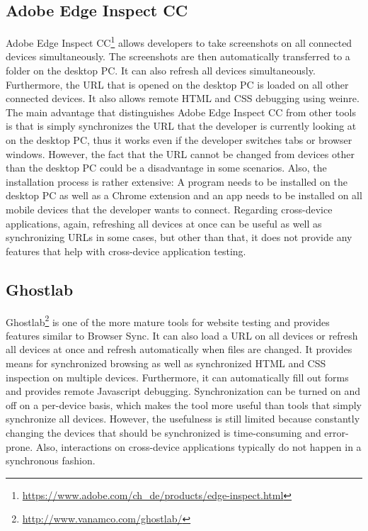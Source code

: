 \subsection{Adobe Edge Inspect CC}

Adobe Edge Inspect CC\footnote{\url{https://www.adobe.com/ch_de/products/edge-inspect.html}} allows developers to take screenshots on all connected devices simultaneously. The screenshots are then automatically transferred to a folder on the desktop PC. It can also refresh all devices simultaneously. Furthermore, the URL that is opened on the desktop PC is loaded on all other connected devices. It also allows remote HTML and CSS debugging using weinre. The main advantage that distinguishes Adobe Edge Inspect CC from other tools is that is simply synchronizes the URL that the developer is currently looking at on the desktop PC, thus it works even if the developer switches tabs or browser windows. However, the fact that the URL cannot be changed from devices other than the desktop PC could be a disadvantage in some scenarios. Also, the installation process is rather extensive: A program needs to be installed on the desktop PC as well as a Chrome extension and an app needs to be installed on all mobile devices that the developer wants to connect. Regarding cross-device applications, again, refreshing all devices at once can be useful as well as synchronizing URLs in some cases, but other than that, it does not provide any features that help with cross-device application testing.

\subsection{Ghostlab}

Ghostlab\footnote{\url{http://www.vanamco.com/ghostlab/}} is one of the more mature tools for website testing and provides features similar to Browser Sync. It can also load a URL on all devices or refresh all devices at once and refresh automatically when files are changed. It provides means for synchronized browsing as well as synchronized HTML and CSS inspection on multiple devices. Furthermore, it can automatically fill out forms and provides remote Javascript debugging. Synchronization can be turned on and off on a per-device basis, which makes the tool more useful than tools that simply synchronize all devices. However, the usefulness is still limited because constantly changing the devices that should be synchronized is time-consuming and error-prone. Also, interactions on cross-device applications typically do not happen in a synchronous fashion.

